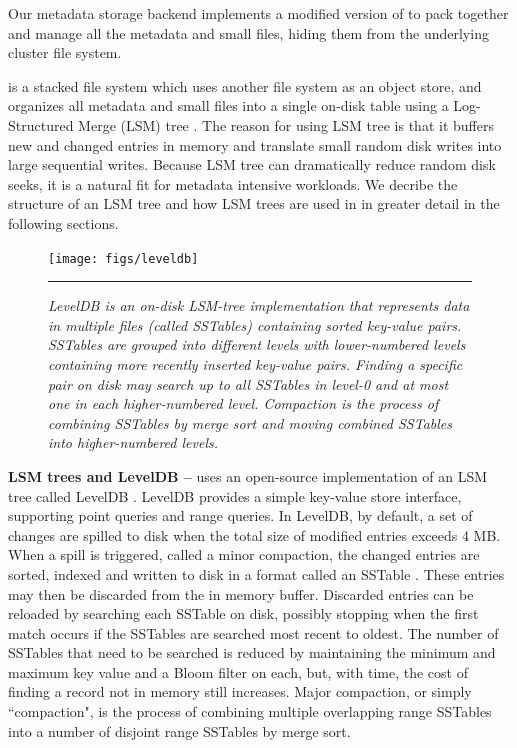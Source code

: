 Our metadata storage backend implements a modified version of \tfs
to pack together and manage all the metadata and small files,
hiding them from the underlying cluster file system.

\tfs \cite{TableFS} is a stacked file system which uses another file system
as an object store, and organizes all metadata and small files into a single
on-disk table using a Log-Structured Merge (LSM) tree \cite{ONeil1996, LevelDB}.
The reason for using LSM tree is that it buffers new and changed entries in
memory and translate small random disk writes into large sequential writes.
Because LSM tree can dramatically reduce random disk seeks,
it is a natural fit for metadata intensive workloads.
We decribe the structure of an LSM tree
and how LSM trees are used in \tfs in greater detail
in the following sections.

\begin{figure}[t]
\texttt{[image: figs/leveldb]}
\vspace{10pt}
\caption{\textit{
LevelDB is an on-disk LSM-tree implementation that represents data in multiple 
files (called SSTables) containing sorted key-value pairs.
SSTables are grouped into different levels with lower-numbered levels
containing more recently inserted key-value pairs.
Finding a specific pair on disk may search up to all SSTables in level-0
and at most one in each higher-numbered level.
Compaction is the process of combining SSTables
by merge sort and moving combined SSTables into higher-numbered levels.
}}
\hrule
\label{fig:leveldb}
\end{figure}


\textbf{LSM trees and LevelDB --}
\tfs uses an open-source implementation of an LSM tree called LevelDB
\cite{LevelDB}. LevelDB provides a simple key-value store interface,
supporting point queries and range queries. In LevelDB, by default,
a set of changes are spilled to disk when the total size of modified
entries exceeds 4 MB.  When a spill is triggered, called a
minor compaction, the changed entries are sorted, indexed and written to disk
in a format called an SSTable \cite{BigTable}.  These entries may then be
discarded from the in memory buffer. Discarded entries
can be reloaded by searching each SSTable
on disk, possibly stopping when the first match occurs if the SSTables are
searched most recent to oldest.  The number of SSTables that need to be
searched is reduced by maintaining the minimum and maximum key value
and a Bloom filter\cite{bloomfilter} on each,
but, with time, the cost of finding a record not in memory still increases.
Major compaction, or simply ``compaction",
is the process of combining multiple overlapping range SSTables
into a number of disjoint range SSTables by merge sort.

